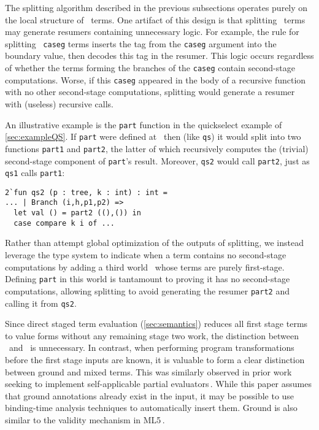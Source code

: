 \begin{abstrsyn}
The splitting algorithm described in the previous subsections operates
purely on the local structure of \lang\ terms.  One artifact of this design
is that splitting \bbonem\ terms may generate resumers containing
unnecessary logic.  For example, the rule for splitting
\bbonem\ \texttt{caseg} terms inserts the tag from the \texttt{caseg}
argument into the boundary value, then decodes this tag in the
resumer. This logic occurs regardless of whether the terms forming the
branches of the \texttt{caseg} contain second-stage computations.
Worse, if this \texttt{caseg} appeared in the body of a recursive
function with no other second-stage computations, splitting would
generate a resumer with (useless) recursive calls.

An illustrative example is the \texttt{part} function in the quickselect
example of \ref{sec:exampleQS}. If \texttt{part} were defined at \bbonem\
then (like \texttt{qs}) it would split into two functions
\texttt{part1} and \texttt{part2}, the latter of which recursively
computes the (trivial) second-stage component of \texttt{part}'s result.
Moreover, \texttt{qs2} would call \texttt{part2}, just as \texttt{qs1}
calls \texttt{part1}:
\begin{lstlisting}
2`fun qs2 (p : tree, k : int) : int =
... | Branch (i,h,p1,p2) =>
  let val () = part2 ((),()) in
  case compare k i of ...
\end{lstlisting}

Rather than attempt global optimization of the outputs of splitting,
we instead leverage the type system to indicate when a term contains
no second-stage computations by adding a third world \bbonep\ whose
terms are purely first-stage.  
Defining \texttt{part} in this world is 
tantamount to proving it has no second-stage computations,
allowing splitting to avoid generating the resumer \texttt{part2}
and calling it from \texttt{qs2}.

Since direct staged term evaluation (\ref{sec:semantics})
reduces all first stage terms to value forms without any remaining stage two work,
the distinction between \bbonem\ and \bbonep\ is unnecessary.
In contrast, when performing program transformations before the first stage inputs are known,
it is valuable to form a clear distinction between ground and mixed terms.
This was similarly observed in prior work seeking to implement self-applicable partial evaluators\,\cite{Mogensen89a,Mogensen89b}.
While this paper assumes that ground annotations already exist in the input,
it may be possible to use binding-time analysis techniques to automatically insert them.
Ground is also similar to the validity mechanism in ML5\,\cite{murphy05}.


\end{abstrsyn}
